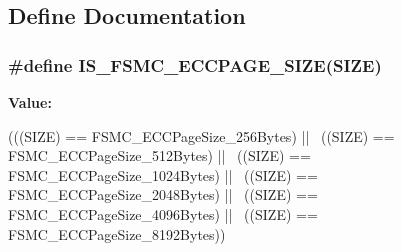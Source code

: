 \subsection{Define Documentation}
\hypertarget{group__FSMC__ECC__Page__Size_ga58fefa0d55875775a88f54ad7498178f}{
\subsubsection[{IS\_\-FSMC\_\-ECCPAGE\_\-SIZE}]{\setlength{\rightskip}{0pt plus 5cm}\#define IS\_\-FSMC\_\-ECCPAGE\_\-SIZE(SIZE)}}
\label{group__FSMC__ECC__Page__Size_ga58fefa0d55875775a88f54ad7498178f}
{\bfseries Value:}
\begin{DoxyCode}
(((SIZE) == FSMC_ECCPageSize_256Bytes) || \
                                    ((SIZE) == FSMC_ECCPageSize_512Bytes) || \
                                    ((SIZE) == FSMC_ECCPageSize_1024Bytes) || \
                                    ((SIZE) == FSMC_ECCPageSize_2048Bytes) || \
                                    ((SIZE) == FSMC_ECCPageSize_4096Bytes) || \
                                    ((SIZE) == FSMC_ECCPageSize_8192Bytes))
\end{DoxyCode}

